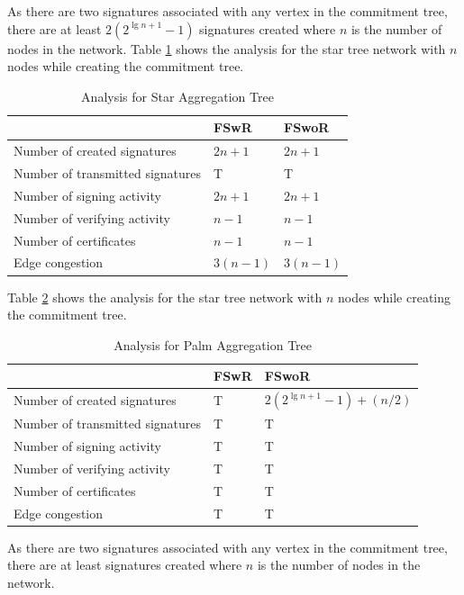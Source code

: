 	As there are two signatures associated with any vertex in the commitment tree, there are at least $2 (2^{\lg n + 1} - 1)$ signatures created where $n$ is the number of nodes in the network.
	Table \ref{table:Analysis table for Star Aggregation Tree} shows the analysis for the star tree network with $n$ nodes while creating the commitment tree.
	\begin{table}[!htb]	
		\begin{center}
			\begin{tabular}{ |l| l| l| }
		    \hline
		    & FSwR & FSwoR \\
		    \hline
		    Number of created signatures & $2n + 1$ & $2n + 1$ \\	
		    \hline
		    Number of transmitted signatures & T & T\\
		    \hline
		    Number of signing activity & $2n + 1$ & $2n + 1$ \\
		    \hline
		    Number of verifying activity & $n - 1$ & $n - 1$ \\
		    \hline
		    Number of certificates & $n - 1$ & $n - 1$ \\
		    \hline
		    Edge congestion & $3(n - 1)$ & $3(n - 1)$\\
		    \hline
			\end{tabular}
		\end{center}
  	\caption{Analysis for Star Aggregation Tree}
	  \label{table:Analysis table for Star Aggregation Tree}
  \end{table}

  Table \ref{table:Analysis table for Palm Aggregation Tree} shows the analysis for the star tree network with $n$ nodes while creating the commitment tree.
	\begin{table}[!htb]	
		\begin{center}
			\begin{tabular}{ |l| l| l| }
		    \hline
		    & FSwR & FSwoR \\
		    \hline
		    Number of created signatures & T & $2 (2^{\lg n + 1} - 1) + (n / 2)$ \\	
		    \hline
		    Number of transmitted signatures & T & T\\
		    \hline
		    Number of signing activity & T & T \\
		    \hline
		    Number of verifying activity & T & T \\
		    \hline
		    Number of certificates & T & T \\
		    \hline
		    Edge congestion & T & T\\
		    \hline
			\end{tabular}
		\end{center}
  	\caption{Analysis for Palm Aggregation Tree}
	  \label{table:Analysis table for Palm Aggregation Tree}
  \end{table}
	As there are two signatures associated with any vertex in the commitment tree, there are at least  signatures created where $n$ is the number of nodes in the network.
	
